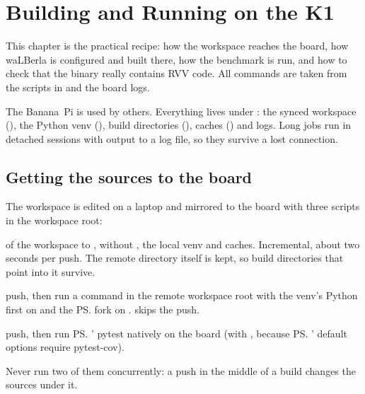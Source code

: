 \chapter{Building and Running on the K1}\label{r02:ch:build-run}

This chapter is the practical recipe: how the workspace reaches the board, how waLBerla
is configured and built there, how the benchmark is run, and how to check that the
binary really contains RVV code. All commands are taken from the scripts in
 and the board logs.

\begin{pitfall}
  The Banana~Pi is used by others. Everything lives under :
  the synced workspace (), the Python venv (), build
  directories (), caches () and logs. Long jobs run
  in detached  sessions with output to a log file, so they survive a lost
  connection.
\end{pitfall}

\section{Getting the sources to the board}\label{r02:sec:push}

The workspace is edited on a laptop and mirrored to the board with three scripts in the
workspace root:
\begin{description}[style=nextline]
  \item[\code{bash push.to.sh bananapi}]  of the workspace to
    , without , the local venv and
    caches. Incremental, about two seconds per push. The remote directory itself is
    kept, so build directories that point into it survive.
  \item[\code{bash run.on.bananapi.sh <command>}] push, then run a command in the remote
    workspace root with the venv's Python first on  and the \ps{} fork on
    .  skips the push.
  \item[\code{bash test.on.bananapi.sh <pytest args>}] push, then run \ps{}' pytest
    natively on the board (with , because \ps{}' default options
    require pytest-cov).
\end{description}
Never run two of them concurrently: a push in the middle of a build changes the
sources under it.

